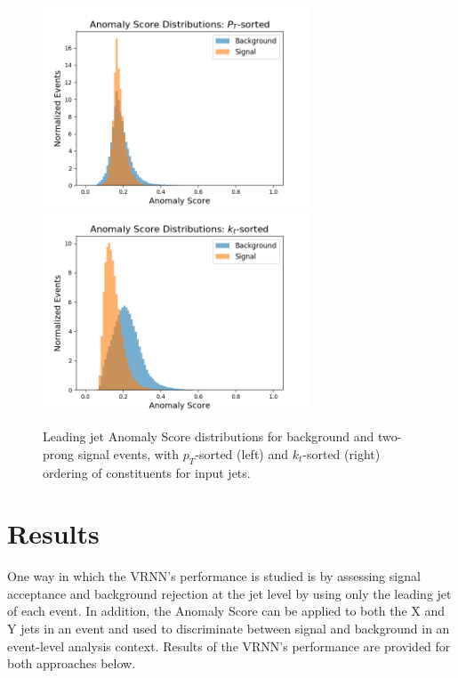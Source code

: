 \documentclass[12pt, a4paper]{article}
\begin{document}
\begin{figure}[H]
	\begin{center}
		\includegraphics[width=225pt]{imgs/Anom_Score_CompPt_SaveForPaper.png}
		\includegraphics[width=225pt]{imgs/bugfix/Anom_Score_CompKt_Rev_Lead_SaveForPaper.png}
	\end{center}
	\caption{Leading jet Anomaly Score distributions for background and two-prong signal events, with $p_T$-sorted (left) and $k_{t}$-sorted (right) ordering of constituents for input jets.}
	\label{fig:score_comp}
\end{figure}





\section{Results}

One way in which the VRNN's performance is studied is by assessing signal acceptance and background rejection at the jet level by using only the leading jet of each event. In addition, the Anomaly Score can be applied to both the X and Y jets in an event and used to discriminate between signal and background in an event-level analysis context. Results of the VRNN's performance are provided for both approaches below.
\end{document}
